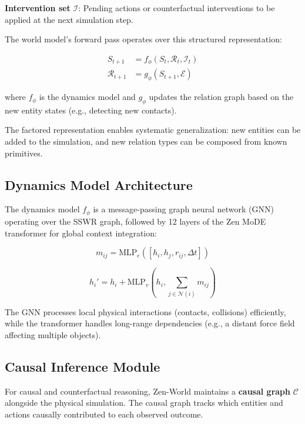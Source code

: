 \documentclass[11pt,a4paper]{article}
\begin{document}
\textbf{Intervention set} $\mathcal{I}$: Pending actions or counterfactual interventions to be
applied at the next simulation step.

The world model's forward pass operates over this structured representation:

\begin{align}
    S_{t+1} &= f_\phi(S_t, \mathcal{R}_t, \mathcal{I}_t) \\
    \mathcal{R}_{t+1} &= g_\phi(S_{t+1}, \mathcal{E})
\end{align}

where $f_\phi$ is the dynamics model and $g_\phi$ updates the relation graph based on the new
entity states (e.g., detecting new contacts).

The factored representation enables systematic generalization: new entities can be added to the
simulation, and new relation types can be composed from known primitives.

\subsection{Dynamics Model Architecture}

The dynamics model $f_\phi$ is a message-passing graph neural network (GNN) operating over the
SSWR graph, followed by 12 layers of the Zen MoDE transformer for global context integration:

\begin{equation}
    m_{ij} = \text{MLP}_e([h_i, h_j, r_{ij}, \Delta t])
\end{equation}

\begin{equation}
    h_i' = h_i + \text{MLP}_v\left(h_i, \sum_{j \in \mathcal{N}(i)} m_{ij}\right)
\end{equation}

The GNN processes local physical interactions (contacts, collisions) efficiently, while the
transformer handles long-range dependencies (e.g., a distant force field affecting multiple
objects).

\subsection{Causal Inference Module}

For causal and counterfactual reasoning, Zen-World maintains a \textbf{causal graph}
$\mathcal{C}$ alongside the physical simulation. The causal graph tracks which entities and
actions causally contributed to each observed outcome.
\end{document}
